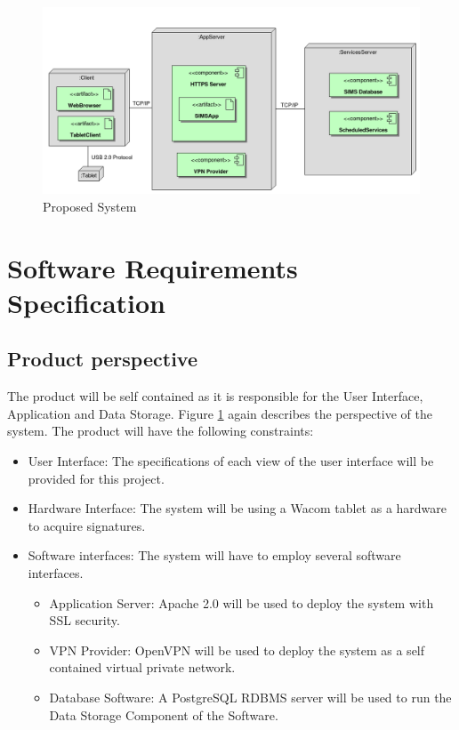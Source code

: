 \documentclass{journal}
\begin{document}
\begin{figure}[htp]
\centering
\includegraphics[scale=0.40]{diagrams/SystemOverview.png}
\caption{Proposed System}
\label{fig:New_Sys}
\end{figure}

\section{Software Requirements Specification}

\subsection{Product perspective}
The product will be self contained as it is responsible for the User Interface, Application and Data Storage.
Figure \ref{fig:New_Sys} again describes the perspective of the system.
The product will have the following constraints:
\begin{itemize}
\item User Interface: The specifications of each view of the user interface will be provided for this project.
\item Hardware Interface: The system will be using a Wacom tablet as a hardware to acquire signatures.
\item Software interfaces: The system will have to employ several software interfaces.
\begin{itemize}
\item Application Server: Apache 2.0 will be used to deploy the system with SSL security.
\item VPN Provider: OpenVPN will be used to deploy the system as a self contained virtual private
network.
\item Database Software: A PostgreSQL RDBMS server will be used to run the Data Storage Component of the Software.
\end{itemize}
\end{itemize}
\end{document}
